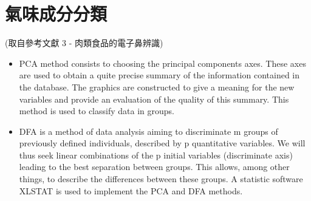 \section{氣味成分分類}
(取自參考文獻 3 - 肉類食品的電子鼻辨識)
\begin{itemize}
	\item PCA method consists to choosing the principal components axes. 
	These axes are used to obtain a quite precise summary of the information 
	contained in the database. The graphics are constructed to give a meaning for 
	the new variables and provide an evaluation of the quality of this summary. 
	This method is used to classify data in groups. 
	\item DFA is a method of data analysis aiming to discriminate m groups of 
	previously defined individuals, described by p quantitative variables. We will 
	thus seek linear combinations of the p initial variables (discriminate axis) 
	leading to the best separation between groups. This allows, among other things, 
	to describe the differences between these groups. A statistic software XLSTAT 
	is used to implement the PCA and DFA methods. 
\end{itemize}